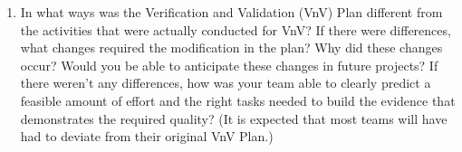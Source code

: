 \documentclass[12pt, titlepage]{article}
\begin{document}
\begin{enumerate}
  \item In what ways was the Verification and Validation (VnV) Plan different
  from the activities that were actually conducted for VnV?  If there were
  differences, what changes required the modification in the plan?  Why did
  these changes occur?  Would you be able to anticipate these changes in future
  projects?  If there weren't any differences, how was your team able to clearly
  predict a feasible amount of effort and the right tasks needed to build the
  evidence that demonstrates the required quality?  (It is expected that most
  teams will have had to deviate from their original VnV Plan.)
\end{enumerate}
\end{document}
